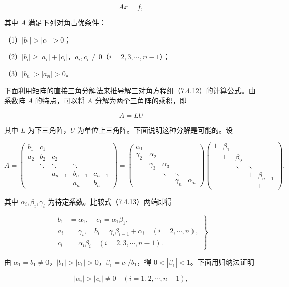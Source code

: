 \[
Ax=f,
\tag{7.4.12}
\]

其中 \(A\) 满足下列对角占优条件：

（1）\(|b_1|>|c_1|>0\)；

（2）\(|b_i|\geqslant|a_i|+|c_i|\)，\(a_i,c_i\neq0\)（\(i=2,3,\cdots,n-1\)）；

（3）\(|b_n|>|a_n|>0\)。

下面利用矩阵的直接三角分解法来推导解三对角方程组（7.4.12）的计算公式。由系数阵 \(A\) 的特点，可以将 \(A\) 分解为两个三角阵的乘积，即

\[
A=LU
\]

其中 \(L\) 为下三角阵，\(U\) 为单位上三角阵。下面说明这种分解是可能的。设

\[
A=\begin{pmatrix}
b_1&c_1&&&\\
a_2&b_2&c_2&&\\
&\ddots&\ddots&\ddots&\\
&&a_{n-1}&b_{n-1}&c_{n-1}\\
&&&a_n&b_n
\end{pmatrix}
=\begin{pmatrix}
\alpha_1&&&&\\
\gamma_2&\alpha_2&&&\\
&\gamma_3&\alpha_3&&\\
&&\ddots&\ddots&\\
&&&\gamma_n&\alpha_n
\end{pmatrix}
\begin{pmatrix}
1&\beta_1&&&\\
&1&\beta_2&&\\
&&\ddots&\ddots&\\
&&&1&\beta_{n-1}\\
&&&&1
\end{pmatrix},
\tag{7.4.13}
\]

其中 \(\alpha_i,\beta_i,\gamma_i\) 为待定系数。比较式（7.4.13）两端即得

\[
\left.\begin{aligned}
b_1&=\alpha_1,\quad c_1=\alpha_1\beta_1,\\
a_i&=\gamma_i,\quad b_i=\gamma_i\beta_{i-1}+\alpha_i\quad(i=2,\cdots,n),\\
c_i&=\alpha_i\beta_i\quad(i=2,3,\cdots,n-1).
\end{aligned}\right\}
\tag{7.4.14}
\]

由 \(\alpha_1=b_1\neq0\)，\(|b_1|>|c_1|>0\)，\(\beta_1=c_1/b_1\)，得 \(0<|\beta_1|<1\)。下面用归纳法证明

\[
|\alpha_i|>|c_i|\neq0\quad(i=1,2,\cdots,n-1),
\tag{7.4.15}
\]

